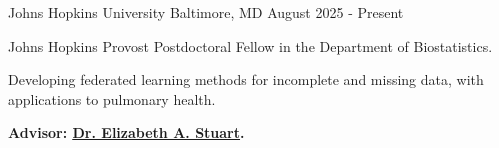 

\begin{cventries}

  {Johns Hopkins University}
    {Baltimore, MD} %
    {August 2025 - Present} %
    {
    \begin{cvitems} 
      \item Johns Hopkins Provost Postdoctoral Fellow in the Department of Biostatistics.
      \item Developing federated learning methods for incomplete and missing data, with applications to pulmonary health.
      \item \textbf{Advisor: \href{https://www.elizabethstuart.org}
            {\underline{Dr. Elizabeth A. Stuart}}.}
      \end{cvitems}
    }

\end{cventries}
